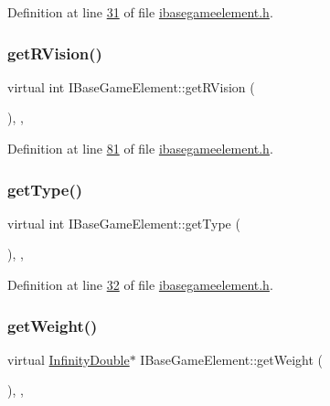 Definition at line \hyperlink{a00047_source_l00031}{31} of file \hyperlink{a00047_source}{ibasegameelement.\+h}.

\mbox{\label{a00137_a4437ee7dcdb6e3e3c58c8b00d8bb0500}} 
\subsubsection{\texorpdfstring{get\+R\+Vision()}{getRVision()}}
{\footnotesize\ttfamily virtual int I\+Base\+Game\+Element\+::get\+R\+Vision (\begin{DoxyParamCaption}{ }\end{DoxyParamCaption})\hspace{0.3cm}{\ttfamily [inline]}, {\ttfamily [virtual]}, {\ttfamily [inherited]}}



Definition at line \hyperlink{a00047_source_l00081}{81} of file \hyperlink{a00047_source}{ibasegameelement.\+h}.

\mbox{\label{a00137_a639bd1e233821ff606bb8fe2931f6ee7}} 
\subsubsection{\texorpdfstring{get\+Type()}{getType()}}
{\footnotesize\ttfamily virtual int I\+Base\+Game\+Element\+::get\+Type (\begin{DoxyParamCaption}{ }\end{DoxyParamCaption})\hspace{0.3cm}{\ttfamily [inline]}, {\ttfamily [virtual]}, {\ttfamily [inherited]}}



Definition at line \hyperlink{a00047_source_l00032}{32} of file \hyperlink{a00047_source}{ibasegameelement.\+h}.

\mbox{\label{a00137_a935a07134430bbb44c3214629d607a3d}} 
\subsubsection{\texorpdfstring{get\+Weight()}{getWeight()}}
{\footnotesize\ttfamily virtual \hyperlink{a00161}{Infinity\+Double}$\ast$ I\+Base\+Game\+Element\+::get\+Weight (\begin{DoxyParamCaption}{ }\end{DoxyParamCaption})\hspace{0.3cm}{\ttfamily [inline]}, {\ttfamily [virtual]}, {\ttfamily [inherited]}}



